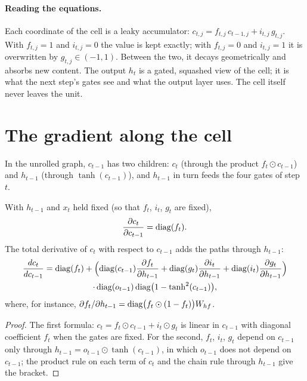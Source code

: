 \begin{notechapter}
\paragraph{Reading the equations.} Each coordinate of the cell is a leaky accumulator:
$c_{t,j} = f_{t,j}\,c_{t-1,j} + i_{t,j}\,g_{t,j}$. With $f_{t,j} = 1$ and $i_{t,j} = 0$ the value is kept exactly; with $f_{t,j} = 0$ and
$i_{t,j} = 1$ it is overwritten by $g_{t,j}\in(-1,1)$. Between the two, it decays geometrically and absorbs
new content. The output $h_t$ is a gated, squashed view of the cell; it is what the next
step's gates see and what the output layer uses. The cell itself never leaves the unit.

\section{The gradient along the cell}\label{gated-rnn:sec:gradient}

In the unrolled graph, $c_{t-1}$ has two children: $c_t$ (through the product $f_t\odot c_{t-1}$) and $h_{t-1}$
(through $\tanh(c_{t-1})$), and $h_{t-1}$ in turn feeds the four gates of step $t$.

\begin{proposition}\label{gated-rnn:prop:cell}
With $h_{t-1}$ and $x_t$ held fixed (so that $f_t$, $i_t$, $g_t$ are fixed),
\[
  \frac{\partial c_t}{\partial c_{t-1}} = \operatorname{diag}(f_t) .
\]
The total derivative of $c_t$ with respect to $c_{t-1}$ adds the paths through $h_{t-1}$:
\begin{multline*}
  \frac{dc_t}{dc_{t-1}} = \operatorname{diag}(f_t) + \Bigl(\operatorname{diag}(c_{t-1})\frac{\partial f_t}{\partial h_{t-1}} + \operatorname{diag}(g_t)\frac{\partial i_t}{\partial h_{t-1}}
  + \operatorname{diag}(i_t)\frac{\partial g_t}{\partial h_{t-1}}\Bigr)\\
  \cdot\operatorname{diag}(o_{t-1})\operatorname{diag}\bigl(1 - \tanh^2(c_{t-1})\bigr),
\end{multline*}
where, for instance, $\partial f_t/\partial h_{t-1} = \operatorname{diag}\bigl(f_t\odot(1 - f_t)\bigr)W_{hf}$.
\end{proposition}

\begin{proof}
The first formula: $c_t = f_t\odot c_{t-1} + i_t\odot g_t$ is linear in $c_{t-1}$ with diagonal coefficient $f_t$ when the gates
are fixed. For the second, $f_t$, $i_t$, $g_t$ depend on $c_{t-1}$ only through $h_{t-1} = o_{t-1}\odot\tanh(c_{t-1})$, in which $o_{t-1}$
does not depend on $c_{t-1}$; the product rule on each term of $c_t$ and the chain rule through $h_{t-1}$ give the
bracket.
\end{proof}


\end{notechapter}
